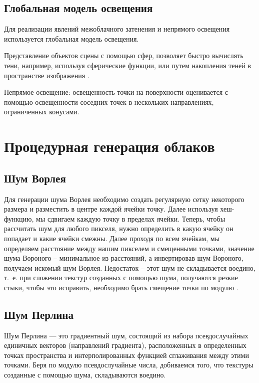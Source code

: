 \subsection{Глобальная модель освещения}

Для реализации явлений межоблачного затенения и непрямого освещения используется глобальная модель освещения.

Представление объектов сцены с помощью сфер, позволяет быстро вычислять тени, например, используя сферические функции, или путем накопления теней в пространстве изображения \cite{clouds}.

Непрямое освещение: освещенность точки на поверхности оценивается с помощью освещенности соседних точек в нескольких направлениях, ограниченных конусами.

\section{Процедурная генерация облаков}

\subsection{Шум Ворлея}

Для генерации шума Ворлея необходимо создать регулярную сетку некоторого размера и разместить в центре каждой ячейки точку. Далее используя хеш-функцию, мы сдвигаем каждую точку в пределах ячейки. Теперь, чтобы рассчитать шум для любого пикселя, нужно определить в какую ячейку он попадает и какие ячейки смежны. Далее проходя по всем ячейкам, мы определяем расстояние между нашим пикселем и смещенными точками, значение шума Вороного – минимальное из расстояний, а инвертировав шум Вороного, получаем искомый шум Ворлея. 
Недостаток – этот шум не складывается воедино, т.~е. при сложении текстур созданных с помощью шума, получаются резкие стыки, чтобы это исправить, необходимо брать смещение точки по модулю \cite{worley}.

\subsection{Шум Перлина}

Шум Перлина — это градиентный шум, состоящий из набора псевдослучайных единичных векторов (направлений градиента), расположенных в определенных точках пространства и интерполированных функцией сглаживания между этими точками. Беря по модулю псевдослучайные числа, добиваемся того, что текстуры созданные с помощью шума, складываются воедино. 



